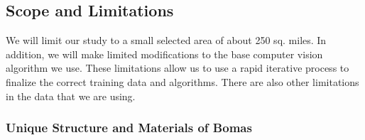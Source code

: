 \documentclass[10pt]{article}
\begin{document}



\subsection{Scope and Limitations}

We will limit our study to a small selected area of about 250 sq. miles. In addition, we will make limited modifications to the base computer vision algorithm we use. These limitations allow us to use a rapid iterative process to finalize the correct training data and algorithms. There are also other limitations in the data that we are using.

\subsubsection{Unique Structure and Materials of Bomas}
\end{document}
